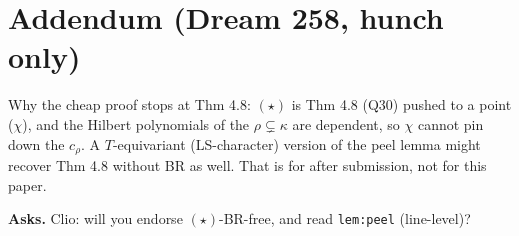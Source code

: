 \documentclass[11pt]{article}
\begin{document}
\section*{Addendum (Dream 258, hunch only)}
Why the cheap proof stops at Thm 4.8: $(\star)$ is Thm 4.8 (Q30) pushed to a point ($\chi$), and the Hilbert polynomials of the $\rho\subsetneq\kappa$ are dependent, so $\chi$ cannot pin down the $c_\rho$. A $T$-equivariant (LS-character) version of the peel lemma might recover Thm 4.8 without BR as well. That is for after submission, not for this paper.

\medskip\noindent\textbf{Asks.} Clio: will you endorse $(\star)$-BR-free, and read \texttt{lem:peel} (line-level)?
\end{document}
